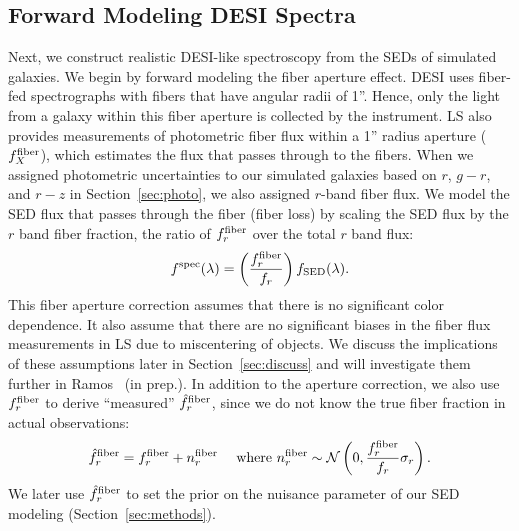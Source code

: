 \subsection{Forward Modeling DESI Spectra} \label{sec:spec}
Next, we construct realistic DESI-like spectroscopy from the SEDs of simulated
galaxies. 
We begin by forward modeling the fiber aperture effect. %
DESI uses fiber-fed spectrographs with fibers that have angular radii of 1''. 
Hence, only the light from a galaxy within this fiber aperture is collected by
the instrument.
LS also provides measurements of photometric fiber flux within a 1'' radius aperture
($f_X^{\rm fiber}$), which estimates the flux that passes through to the fibers.
When we assigned photometric uncertainties to our simulated galaxies based on
$r$, $g-r$, and $r-z$ in Section~\ref{sec:photo}, we also assigned $r$-band
fiber flux. 
We model the SED flux that passes through the fiber (fiber loss) by scaling the 
SED flux by the $r$ band fiber fraction, the ratio of $f_r^{\rm fiber}$ over
the total $r$ band flux: 
\begin{equation}
    f^{\rm spec}(\lambda) = \left(\frac{f_r^{\rm fiber}}{f_r}\right)f_{\rm SED}(\lambda).
\end{equation}
This fiber aperture correction assumes that there is no significant color
dependence. 
It also assume that there are no significant biases in the fiber flux
measurements in LS due to miscentering of objects. 
We discuss the implications of these assumptions later in
Section~\ref{sec:discuss} and will investigate them further in Ramos \etal~(in
prep.). 
In addition to the aperture correction, we also use $f_r^{\rm fiber}$ to derive
``measured'' $\hat{f}_r^{\rm fiber}$, since we do not know the true fiber
fraction in actual observations: 
\begin{equation}
    \hat{f}_r^{\rm fiber} = f_r^{\rm fiber} + n^{\rm fiber}_r \quad~{\rm
    where}~n^{\rm fiber}_r \sim \mathcal{N}\left(0, \frac{f_r^{\rm fiber}}{f_r}
    \sigma_r\right).
\end{equation}
We later use $\hat{f}_r^{\rm fiber}$ to set the prior on the nuisance parameter
of our SED modeling (Section~\ref{sec:methods}).

